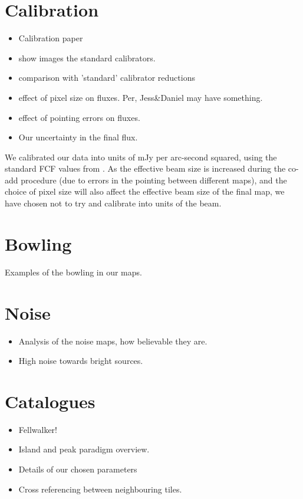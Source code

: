 \documentclass[usenatbib]{mn2e}
\begin{document}
\section{Calibration}
\begin{itemize}
\item Calibration paper \citep{Dempsey2013}
\item show images the standard calibrators.
\item comparison with 'standard' calibrator reductions
\item effect of pixel size on fluxes. Per, Jess\&Daniel may have something.
\item effect of pointing errors on fluxes.
\item Our uncertainty in the final flux.
\end{itemize}


We calibrated our data into units of mJy per arc-second squared, using
the standard FCF values from \citet{Dempsey2013}.  As the
effective beam size is increased during the co-add procedure (due to
errors in the pointing between different maps), and the choice of
pixel size will also affect the effective beam size of the final map,
we have chosen not to try and calibrate into units of the beam.


\section{Bowling}
Examples of the bowling in our maps.

\section{Noise}
\begin{itemize}
\item Analysis of the noise maps, how believable they are.
\item High noise towards bright sources.
\end{itemize}



\section{Catalogues}
\begin{itemize}
\item Fellwalker! \citep{Berry2015}
\item Island and peak paradigm overview.
\item Details of our chosen parameters
\item Cross referencing between neighbouring tiles.
\end{itemize}
\end{document}
